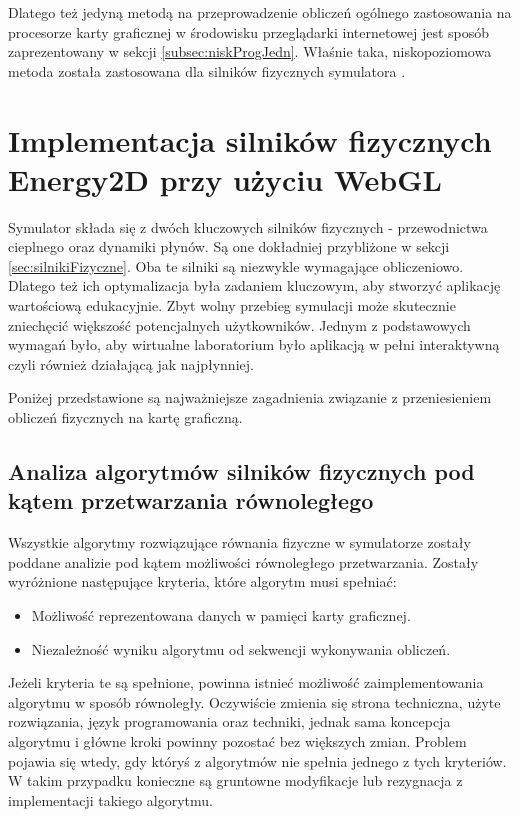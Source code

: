 Dlatego też jedyną metodą na przeprowadzenie obliczeń ogólnego zastosowania na
procesorze karty graficznej w środowisku przeglądarki internetowej jest sposób
zaprezentowany w sekcji \ref{subsec:niskProgJedn}. Właśnie taka,
niskopoziomowa metoda została zastosowana dla silników fizycznych symulatora
.

\section{Implementacja silników fizycznych Energy2D przy użyciu WebGL}
\label{sec:implSilFizWebGL}

Symulator  składa się z dwóch kluczowych silników fizycznych -
przewodnictwa cieplnego oraz dynamiki płynów. Są one dokładniej przybliżone w
sekcji \ref{sec:silnikiFizyczne}. Oba te silniki są niezwykle wymagające
obliczeniowo. Dlatego też ich optymalizacja była zadaniem kluczowym, aby
stworzyć aplikację wartościową edukacyjnie. Zbyt wolny przebieg symulacji może
skutecznie zniechęcić większość potencjalnych użytkowników. Jednym z
podstawowych wymagań było, aby wirtualne laboratorium było aplikacją w pełni
interaktywną czyli również działającą jak najpłynniej.

Poniżej przedstawione są najważniejsze zagadnienia związanie z przeniesieniem
obliczeń fizycznych  na kartę graficzną.

\subsection{Analiza algorytmów silników fizycznych pod kątem przetwarzania
równoległego}  

Wszystkie algorytmy rozwiązujące równania fizyczne w symulatorze 
zostały poddane analizie pod kątem możliwości równoległego przetwarzania.
Zostały wyróżnione następujące kryteria, które algorytm musi spełniać:

\begin{itemize}

\item Możliwość reprezentowana danych w pamięci karty graficznej.

\item Niezależność wyniku algorytmu od sekwencji wykonywania obliczeń.

\end{itemize}

Jeżeli kryteria te są spełnione, powinna istnieć możliwość zaimplementowania
algorytmu w sposób równoległy. Oczywiście zmienia się strona techniczna, użyte
rozwiązania, język programowania oraz techniki, jednak sama koncepcja
algorytmu i główne kroki powinny pozostać bez większych zmian. Problem pojawia
się wtedy, gdy któryś z algorytmów nie spełnia jednego z tych kryteriów. W
takim przypadku konieczne są gruntowne modyfikacje lub rezygnacja z
implementacji takiego algorytmu.

